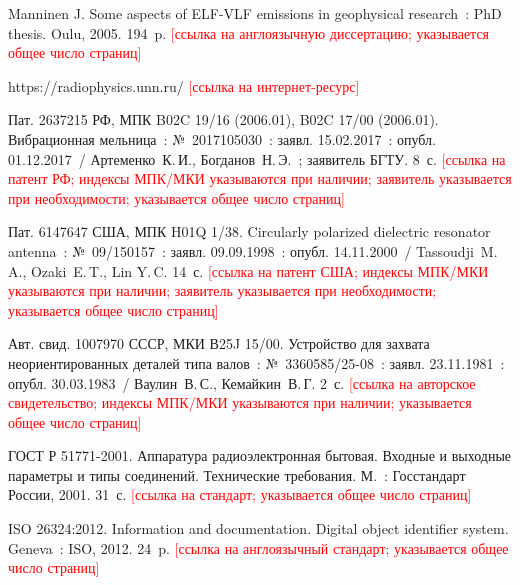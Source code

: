 \documentclass[12pt, a4paper]{article}
\begin{document}
\begin{thebibliography}{99}
Manninen J. Some aspects of ELF-VLF emissions in geophysical research~: PhD thesis. Oulu, 2005. 194~p.
\textcolor{red}{[ссылка на англоязычную диссертацию; указывается общее число страниц]}

https://radiophysics.unn.ru/
\textcolor{red}{[ссылка на интернет-ресурс]}

Пат. 2637215 РФ, МПК B02C 19/16 (2006.01), B02C 17/00 (2006.01). Вибрационная мельница~: №~2017105030~: заявл. 15.02.2017~: опубл. 01.12.2017~/ Артеменко~К.\,И., Богданов~Н.\,Э.~; заявитель БГТУ. 8~с.
\textcolor{red}{[ссылка на патент РФ; индексы МПК/МКИ указываются при наличии; заявитель указывается при необходимости; указывается общее число страниц]}

Пат. 6147647 США, МПК H01Q 1/38. Circularly polarized dielectric resonator antenna~: №~09/150157~: заявл. 09.09.1998~: опубл. 14.11.2000~/ Tassoudji~M.\,A., Ozaki~E.\,T., Lin Y.\,C. 14~с.
\textcolor{red}{[ссылка на патент США; индексы МПК/МКИ указываются при наличии; заявитель указывается при необходимости; указывается общее число страниц]}

Авт. свид. 1007970 СССР, МКИ В25J 15/00. Устройство для захвата неориентированных деталей типа валов~: №~3360585/25-08~: заявл. 23.11.1981~: опубл. 30.03.1983~/ Ваулин~В.\,С., Кемайкин~В.\,Г. 2~с.
\textcolor{red}{[ссылка на авторское свидетельство; индексы МПК/МКИ указываются при наличии; указывается общее число страниц]}

ГОСТ Р 51771-2001. Аппаратура радиоэлектронная бытовая. Входные и выходные параметры и типы соединений. Технические требования. М.~: Госстандарт России, 2001. 31~с.
\textcolor{red}{[ссылка на стандарт; указывается общее число страниц]}

ISO 26324:2012. Information and documentation. Digital object identifier system. Geneva~: ISO, 2012. 24~p.
\textcolor{red}{[ссылка на англоязычный стандарт; указывается общее число страниц]}

\end{thebibliography}
\end{document}
